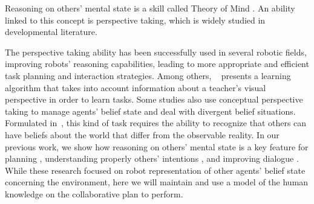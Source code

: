 \documentclass{llncs}
\begin{document}


Reasoning on others' mental state is a skill called Theory of Mind \cite{premack1978does}. An ability linked to this concept is perspective taking, which is widely studied in developmental literature. 

The perspective taking ability has been successfully used in several robotic fields, improving robots' reasoning capabilities, leading to more appropriate and efficient task planning and interaction strategies.
Among others, ~\cite{breazeal2006} presents a learning algorithm that takes into account information about a teacher's visual perspective in order to learn tasks.
Some studies also use conceptual perspective taking to manage agents' belief state and deal with divergent belief situations. Formulated in~\cite{wimmer1983}, this kind of task requires the ability to recognize that others can have beliefs about the world that differ from the observable reality.
In our previous work, we show how reasoning on others' mental state is a key feature for planning \cite{guitton2012}, understanding properly others' intentions \cite{fiore2015}, and improving dialogue \cite{Ferreira2015}. While these research focused on robot representation of other agents' belief state concerning the environment, here we will maintain and use a model of the human knowledge on the collaborative plan to perform.
\end{document}
